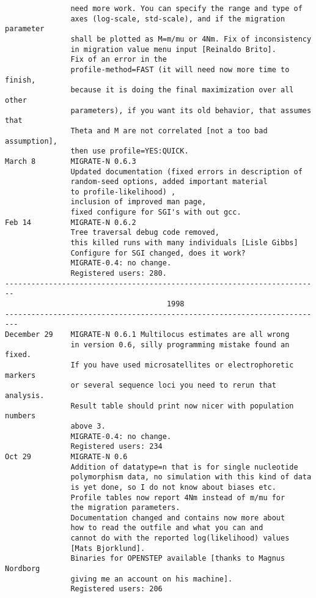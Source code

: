 \begin{small}
\begin{verbatim}
               need more work. You can specify the range and type of 
               axes (log-scale, std-scale), and if the migration parameter
               shall be plotted as M=m/mu or 4Nm. Fix of inconsistency 
               in migration value menu input [Reinaldo Brito]. 
               Fix of an error in the
               profile-method=FAST (it will need now more time to finish,
               because it is doing the final maximization over all other
               parameters), if you want its old behavior, that assumes that 
               Theta and M are not correlated [not a too bad assumption], 
               then use profile=YES:QUICK.  
March 8        MIGRATE-N 0.6.3
               Updated documentation (fixed errors in description of
               random-seed options, added important material 
               to profile-likelihood) , 
               inclusion of improved man page,
               fixed configure for SGI's with out gcc. 
Feb 14         MIGRATE-N 0.6.2 
               Tree traversal debug code removed,
               this killed runs with many individuals [Lisle Gibbs]
               Configure for SGI changed, does it work?
               MIGRATE-0.4: no change.
               Registered users: 280.
------------------------------------------------------------------------
                                     1998
-------------------------------------------------------------------------
December 29    MIGRATE-N 0.6.1 Multilocus estimates are all wrong 
               in version 0.6, silly programming mistake found an fixed.
               If you have used microsatellites or electrophoretic markers
               or several sequence loci you need to rerun that analysis.
               Result table should print now nicer with population numbers 
               above 3.  
               MIGRATE-0.4: no change.
               Registered users: 234
Oct 29         MIGRATE-N 0.6
               Addition of datatype=n that is for single nucleotide
               polymorphism data, no simulation with this kind of data
               is yet done, so I do not know about biases etc. 
               Profile tables now report 4Nm instead of m/mu for
               the migration parameters.
               Documentation changed and contains now more about 
               how to read the outfile and what you can and 
               cannot do with the reported log(likelihood) values 
               [Mats Bjorklund].
               Binaries for OPENSTEP available [thanks to Magnus Nordborg
               giving me an account on his machine].
               Registered users: 206

\end{verbatim}
\end{small}

